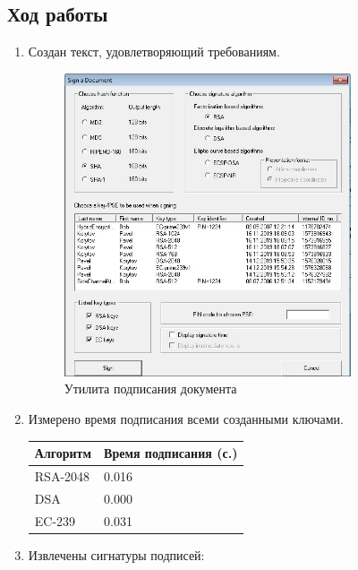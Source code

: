 \documentclass[a4paper, 14pt]{extarticle}
\begin{document}
\subsection{Ход работы}
\begin{enumerate}
    \item Создан текст, удовлетворяющий требованиям.
        \begin{figure}[h]
            \centering
            \includegraphics[width=0.8\textwidth]{img/S004.jpg}
            \caption{Утилита подписания документа}%
            \label{img:2:2}
        \end{figure}
        \FloatBarrier{}
    \item Измерено время подписания всеми созданными ключами.
        \begin{table}[h]
            \centering
            \begin{tabular}{@{}ll@{}}
                \toprule
                \textbf{Алгоритм} & \textbf{Время подписания (с.)} \\ \midrule
                RSA-2048          & 0.016                          \\
                DSA               & 0.000                          \\
                EC-239            & 0.031                          \\ \bottomrule
            \end{tabular}
        \end{table}
        \FloatBarrier{}
    \item Извлечены сигнатуры подписей:

\end{enumerate}
\end{document}
